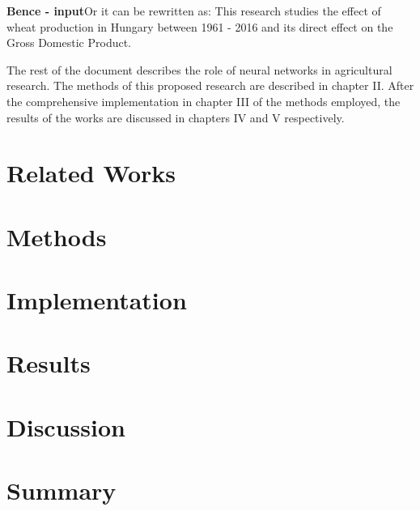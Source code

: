 \documentclass[
]{thesis-ekf}
\begin{document}
\textbf{Bence - input}Or it can be rewritten as: This research studies the effect of wheat production in Hungary between 1961 - 2016 and its direct effect on the Gross Domestic Product.

The rest of the document describes the role of neural networks in agricultural research. The methods of this proposed research are described in chapter II. After the comprehensive implementation in chapter III of the methods employed, the results of the works are discussed in chapters IV and V respectively.





\chapter{Related Works}



\chapter{Methods}



\chapter{Implementation}


\chapter{Results}



\chapter{Discussion}




\chapter{Summary}








\end{document}
